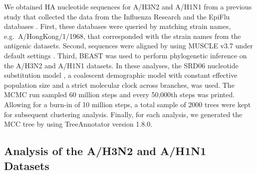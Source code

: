 \documentclass[11pt,oneside,letterpaper]{article}
\begin{document}
We obtained HA nucleotide sequences for A/H3N2 and A/H1N1 from a previous study \cite{bedford_integrating_2014} that collected the data from the Influenza Research \cite{IRD} and the EpiFlu databases \cite{GISAID}. 
First, these databases were queried by matching strain names, e.g.\ A/HongKong/1/1968, that corresponded with the strain names from the antigenic datasets.
Second, sequences were aligned by using MUSCLE v3.7 under default settings \cite{MUSCLE}.
Third, BEAST\cite{BEAST17} was used to perform phylogenetic inference on the A/H3N2 and A/H1N1 datasets.
In these analyses, the SRD06 nucleotide substitution model \cite{Shapiro06}, a coalescent demographic model with constant effective population size and a strict molecular clock across branches, was used.
The MCMC run sampled 60 million steps and every 50,000th steps was printed.
Allowing for a burn-in of 10 million steps, a total sample of 2000 trees were kept for subsequent clustering analysis.
Finally, for each analysis, we generated the MCC tree by using TreeAnnotator version 1.8.0.





\subsection*{Analysis of the A/H3N2 and A/H1N1 Datasets}
	
\end{document}
